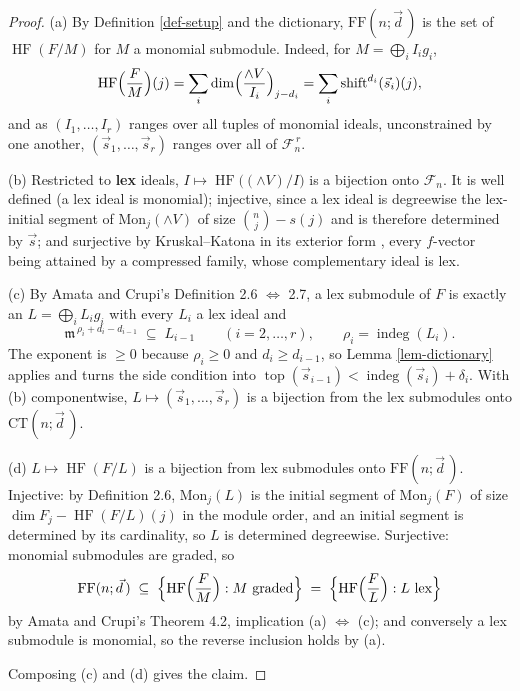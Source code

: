 \documentclass[11pt, a4paper, abstract=yes]{scrartcl}
\theoremstyle{definition}
\theoremstyle{remark}
\theoremstyle{plain}
\newcommand{\shift}{\operatorname{shift}}
\newcommand{\indeg}{\operatorname{indeg}}
\newcommand{\tp}{\operatorname{top}}
\newcommand{\HF}{\operatorname{HF}}
\newcommand{\Ext}{\mathord{\wedge }V}
\begin{document}
\begin{proof}
(a) By Definition \ref{def-setup} and the dictionary, \(\mathrm{FF}(n;\vec d\,)\) is the set of \(\HF(F/M)\)
for \(M\) a monomial submodule. Indeed, for \(M=\bigoplus_iI_ig_i\),
\[
  \HF\Bigl(\frac FM\Bigr)(j)=\sum_i\dim\Bigl(\frac{\Ext}{I_i}\Bigr)_{j-d_i}
    =\sum_i\shift^{d_i}(\vec s_i)(j) ,
\]
and as \((I_1,\dots,I_r)\) ranges over all tuples of monomial ideals, unconstrained by one another,
\((\vec s_1,\dots,\vec s_r)\) ranges over all of \(\mathcal F_n^{\,r}\).

(b) Restricted to \textbf{lex} ideals, \(I\mapsto\HF\bigl((\Ext)/I\bigr)\) is a bijection onto \(\mathcal F_n\). It is well
defined (a lex ideal is monomial); injective, since a lex ideal is degreewise the lex-initial segment
of \(\mathrm{Mon}_j(\Ext)\) of size \(\binom nj-s(j)\) and is therefore determined by \(\vec s\); and
surjective by Kruskal--Katona in its exterior form \textcite[Theorem 4.1]{AramovaHerzogHibi1997}, every \(f\)-vector being attained by a compressed
family, whose complementary ideal is lex.

(c) By Amata and Crupi's Definition 2.6 \(\Leftrightarrow\) 2.7, a lex submodule of \(F\) is exactly
an \(L=\bigoplus_iL_ig_i\) with every \(L_i\) a lex ideal and
\[
  \mathfrak m^{\,\rho_i+d_i-d_{i-1}}\;\subseteq\;L_{i-1}
  \qquad (i=2,\dots,r),\qquad \rho_i=\indeg(L_i) .
\]
The exponent is \(\ge0\) because \(\rho_i\ge0\) and \(d_i\ge d_{i-1}\), so
Lemma \ref{lem-dictionary} applies and turns the side condition into
\(\tp(\vec s_{i-1})<\indeg(\vec s_i)+\delta_i\). With (b) componentwise, \(L\mapsto(\vec s_1,\dots,\vec s_r)\) is a
bijection from the lex submodules onto \(\mathrm{CT}(n;\vec d\,)\).

(d) \(L\mapsto\HF(F/L)\) is a bijection from lex submodules onto \(\mathrm{FF}(n;\vec d\,)\). Injective: by
Definition 2.6, \(\mathrm{Mon}_j(L)\) is the initial segment of \(\mathrm{Mon}_j(F)\) of size
\(\dim F_j-\HF(F/L)(j)\) in the module order, and an initial segment is determined by its
cardinality, so \(L\) is determined degreewise. Surjective: monomial submodules are graded, so
\begin{equation}\label{eq:FF-in-lex}
  \mathrm{FF}(n;\vec d\,)\;\subseteq\;\Bigl\lbrace\HF\Bigl(\frac FM\Bigr):M\ \text{graded}\Bigr\rbrace
  \;=\;\Bigl\lbrace\HF\Bigl(\frac FL\Bigr):L\ \text{lex}\Bigr\rbrace
\end{equation}
by Amata and Crupi's Theorem 4.2, implication (a) \(\Leftrightarrow\) (c); and conversely a lex
submodule is monomial, so the reverse inclusion holds by (a).

Composing (c) and (d) gives the claim.
\end{proof}
\end{document}
